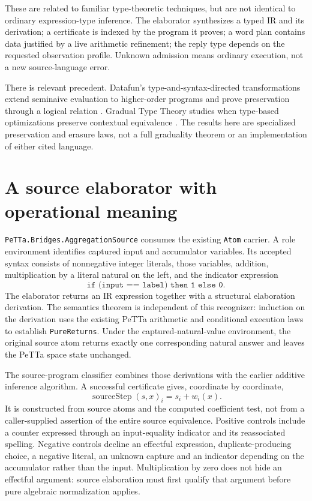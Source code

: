 \documentclass[11pt,a4paper]{article}
\newcommand{\code}[1]{\nolinkurl{#1}}
\begin{document}
These are related to familiar type-theoretic techniques, but are not identical
to ordinary expression-type inference. The elaborator synthesizes a typed IR
and its derivation; a certificate is indexed by the program it proves; a word
plan contains data justified by a live arithmetic refinement; the reply type
depends on the requested observation profile. Unknown admission means ordinary
execution, not a new source-language error.

There is relevant precedent. Datafun's type-and-syntax-directed transformations
extend seminaive evaluation to higher-order programs and prove preservation
through a logical relation \cite{datafun}. Gradual Type Theory studies when
type-based optimizations preserve contextual equivalence \cite{gtt}. The
results here are specialized preservation and erasure laws, not a full
graduality theorem or an implementation of either cited language.

\section{A source elaborator with operational meaning}

\code{PeTTa.Bridges.AggregationSource} consumes the existing \code{Atom}
carrier. A role environment identifies captured input and accumulator
variables. Its accepted syntax consists of nonnegative integer literals,
those variables, addition, multiplication by a literal natural on the left,
and the indicator expression
\[
 \texttt{if (input == label) then 1 else 0}.
\]
The elaborator returns an IR expression together with a structural elaboration
derivation. The semantics theorem is independent of this recognizer: induction
on the derivation uses the existing PeTTa arithmetic and conditional execution
laws to establish \code{PureReturns}. Under the captured-natural-value
environment, the original source atom returns exactly one corresponding
natural answer and leaves the PeTTa space state unchanged.

The source-program classifier combines those derivations with the earlier
additive inference algorithm. A successful certificate gives, coordinate by
coordinate,
\[
  \operatorname{sourceStep}(s,x)_i=s_i+w_i(x).
\]
It is constructed from source atoms and the computed coefficient test, not
from a caller-supplied assertion of the entire source equivalence. Positive
controls include a counter expressed through an input-equality indicator and
its reassociated spelling. Negative controls decline an effectful expression,
duplicate-producing choice, a negative literal, an unknown capture and an
indicator depending on the accumulator rather than the input.
Multiplication by zero does not hide an effectful argument: source elaboration
must first qualify that argument before pure algebraic normalization applies.
\end{document}
